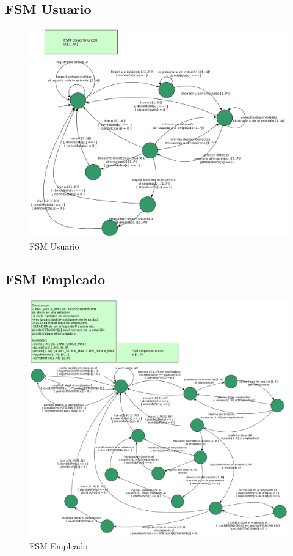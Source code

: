 \subsection{FSM Usuario}

\begin{figure}[H]
	\centering
	\includegraphics[scale=0.255]{imgs/fsm_usuario.png}
	\caption{FSM Usuario}
\end{figure}

\subsection{FSM Empleado}

\begin{figure}[H]
	\centering
	\includegraphics[scale=0.21]{imgs/fsm_empleado.png}
	\caption{FSM Empleado}
\end{figure}